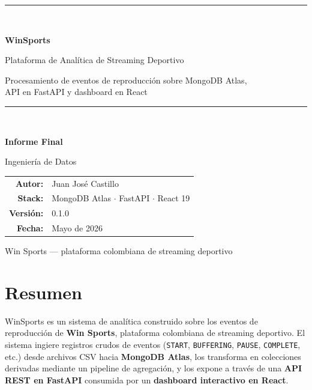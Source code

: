 \documentclass[12pt, letterpaper]{article}
\newcommand{\code}[1]{\texttt{#1}}
\begin{document}
\begin{titlepage}
  \centering
  \vspace*{2cm}
  {\color{winorange}\rule{\linewidth}{2pt}}\\[0.6cm]
  {\Huge\bfseries WinSports\par}
  \vspace{0.3cm}
  {\LARGE Plataforma de Analítica de Streaming Deportivo\par}
  \vspace{0.2cm}
  {\large Procesamiento de eventos de reproducción sobre MongoDB Atlas,\\
   API en FastAPI y dashboard en React\par}
  {\color{winorange}\rule{\linewidth}{2pt}}\\[1.5cm]

  {\large\bfseries Informe Final\par}
  \vspace{0.4cm}
  {\large Ingeniería de Datos\par}
  \vspace{2.5cm}

  \begin{tabular}{rl}
    \textbf{Autor:} & Juan José Castillo \\[4pt]
    \textbf{Stack:} & MongoDB Atlas $\cdot$ FastAPI $\cdot$ React 19 \\[4pt]
    \textbf{Versión:} & 0.1.0 \\[4pt]
    \textbf{Fecha:} & Mayo de 2026 \\
  \end{tabular}

  \vfill
  {\color{codegray}\small Win Sports — plataforma colombiana de streaming deportivo\par}
\end{titlepage}

\tableofcontents
\newpage

\section{Resumen}
WinSports es un sistema de analítica construido sobre los eventos de
reproducción de \textbf{Win Sports}, plataforma colombiana de streaming
deportivo. El sistema ingiere registros crudos de eventos
(\code{START}, \code{BUFFERING}, \code{PAUSE}, \code{COMPLETE}, etc.) desde
archivos CSV hacia \textbf{MongoDB Atlas}, los transforma en colecciones
derivadas mediante un pipeline de agregación, y los expone a través de una
\textbf{API REST en FastAPI} consumida por un \textbf{dashboard interactivo en
React}.
\end{document}

